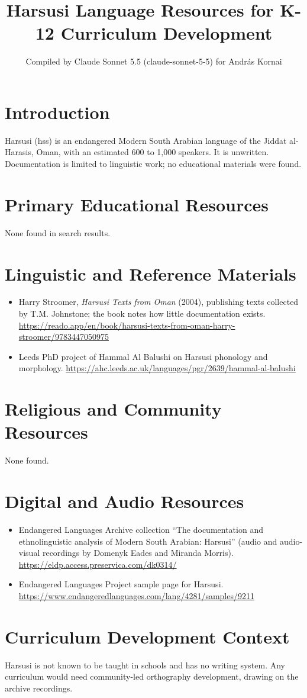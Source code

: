 \documentclass[12pt]{article}
\title{Harsusi Language Resources for K-12 Curriculum Development}
\author{Compiled by Claude Sonnet 5.5 (claude-sonnet-5-5) for Andr\'as Kornai}
\date{}
\begin{document}
\maketitle

\section{Introduction}
Harsusi (hss) is an endangered Modern South Arabian language of the Jiddat al-Harasis, Oman, with an estimated 600 to 1,000 speakers. It is unwritten. Documentation is limited to linguistic work; no educational materials were found.

\section{Primary Educational Resources}
None found in search results.

\section{Linguistic and Reference Materials}
\begin{itemize}
\item Harry Stroomer, \emph{Harsusi Texts from Oman} (2004), publishing texts collected by T.M. Johnstone; the book notes how little documentation exists. \url{https://reado.app/en/book/harsusi-texts-from-oman-harry-stroomer/9783447050975}
\item Leeds PhD project of Hammal Al Balushi on Harsusi phonology and morphology. \url{https://ahc.leeds.ac.uk/languages/pgr/2639/hammal-al-balushi}
\end{itemize}

\section{Religious and Community Resources}
None found.

\section{Digital and Audio Resources}
\begin{itemize}
\item Endangered Languages Archive collection ``The documentation and ethnolinguistic analysis of Modern South Arabian: Harsusi'' (audio and audio-visual recordings by Domenyk Eades and Miranda Morris). \url{https://eldp.access.preservica.com/dk0314/}
\item Endangered Languages Project sample page for Harsusi. \url{https://www.endangeredlanguages.com/lang/4281/samples/9211}
\end{itemize}

\section{Curriculum Development Context}
Harsusi is not known to be taught in schools and has no writing system. Any curriculum would need community-led orthography development, drawing on the archive recordings.
\end{document}
